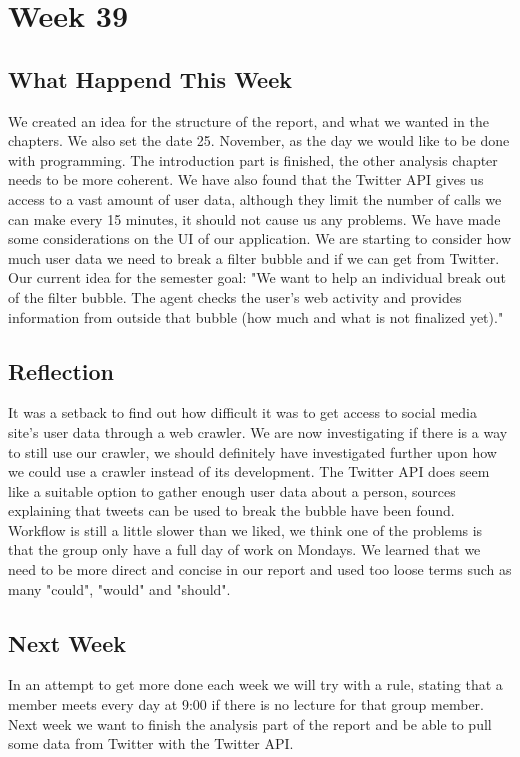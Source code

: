\section*{Week 39}
\subsection*{What Happend This Week}
We created an idea for the structure of the report, and what we wanted in the
chapters. We also set the date 25. November, as the day we would like to be done
with programming. The introduction part is finished, the other analysis chapter
needs to be more coherent.
We have also found that the Twitter \ac{API} gives us access to a vast amount of
user data, although they limit the number of calls we can make every 15 minutes, it
should not cause us any problems. We have made some considerations on the
\ac{UI} of our application. We are starting to consider how much user data we need to break
a filter bubble and if we can get from Twitter.
Our current idea for the semester goal: "We want to help an individual break out
of the filter bubble. The agent checks the user's web activity and provides
information from outside that bubble (how much and what is not finalized yet)."


\subsection*{Reflection}
It was a setback to find out how difficult it was to
get access to social media site's user data through a web crawler. We are now
investigating if there is a way to still use our crawler, we should definitely
have investigated further upon how we could use a crawler instead of its
development.
The Twitter \ac{API} does seem like a suitable option to gather enough user data
about a person, sources explaining that tweets can be used to break the bubble
have been found. Workflow is still a little slower than we liked, we think one
of the problems is that the group only have a full day of work on Mondays. We
learned that we need to be more direct and concise in our report and used too
loose terms such as many "could", "would" and "should".

\subsection*{Next Week}
In an attempt to get more done each week we will try
with a rule, stating that a member meets every day at 9:00 if there is no
lecture for that group member. Next week we want to finish the analysis part of
the report and be able to pull some data from Twitter with the Twitter \ac{API}.



